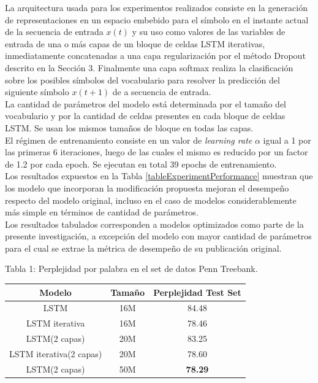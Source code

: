 \documentclass{article}
\begin{document}
	La arquitectura usada para los experimentos realizados consiste en la generación de representaciones en un espacio embebido para el símbolo en el instante actual de la secuencia de entrada $x(t)$ y su uso como valores de las variables de entrada de una o más capas de un bloque de celdas LSTM iterativas, inmediatamente concatenadas a una capa regularización por el método Dropout descrito en la Sección 3. Finalmente una capa softmax realiza la clasificación sobre los posibles símbolos del vocabulario para resolver la predicción del siguiente símbolo $x(t+1)$ de a secuencia de entrada.\\
	La cantidad de parámetros del modelo está determinada por el tamaño del vocabulario y por la cantidad de celdas presentes en cada bloque de celdas LSTM. Se usan los mismos tamaños de bloque en todas las capas.\\
	El régimen de entrenamiento consiste en un valor de \textit{learning rate} $\alpha$ igual a 1 por las primeras 6 iteraciones, luego de las cuales el mismo es reducido por un factor de 1.2 por cada epoch. Se ejecutan en total 39 epochs de entrenamiento.\\
	Los resultados expuestos en la Tabla \ref{tableExperimentPerformance} muestran que los modelo que incorporan la modificación propuesta mejoran el desempeño respecto del modelo original, incluso en el caso de modelos considerablemente más simple en términos de cantidad de parámetros.\\
	Los resultados tabulados corresponden a modelos optimizados como parte de la presente investigación, a excepción del modelo con mayor cantidad de parámetros para el cual se extrae la métrica de desempeño de su publicación original\cite{14RegularizationZaremba}.\\
	\begin{center}
		Tabla 1: Perplejidad por palabra en el set de datos Penn Treebank.\\
		
		\begin{tabular}[t]{| c  | c | c |}
			\hline
			Modelo & Tamaño & Perplejidad Test Set\\
			\hline
			\hline
			LSTM & 16M  & 84.48\\
			\hline
			LSTM iterativa & 16M  & 78.46\\
			\hline
			\hline
			LSTM(2 capas) & 20M  & 83.25\\
			\hline
			LSTM iterativa(2 capas) & 20M  & 78.60\\
			\hline
			\hline
			LSTM(2 capas)& 50M & \textbf{78.29}\\
			\hline
		\end{tabular}
		\label{tableExperimentPerformance}
	\end{center}
	
\end{document}
